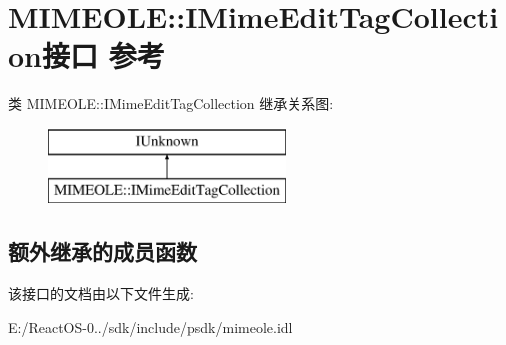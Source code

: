 \hypertarget{interface_m_i_m_e_o_l_e_1_1_i_mime_edit_tag_collection}{}\section{M\+I\+M\+E\+O\+LE\+:\+:I\+Mime\+Edit\+Tag\+Collection接口 参考}
\label{interface_m_i_m_e_o_l_e_1_1_i_mime_edit_tag_collection}
类 M\+I\+M\+E\+O\+LE\+:\+:I\+Mime\+Edit\+Tag\+Collection 继承关系图\+:\begin{figure}[H]
\begin{center}
\leavevmode
\includegraphics[height=2.000000cm]{interface_m_i_m_e_o_l_e_1_1_i_mime_edit_tag_collection}
\end{center}
\end{figure}
\subsection*{额外继承的成员函数}


该接口的文档由以下文件生成\+:\begin{DoxyCompactItemize}
\item 
E\+:/\+React\+O\+S-\/0../sdk/include/psdk/mimeole.\+idl\end{DoxyCompactItemize}
